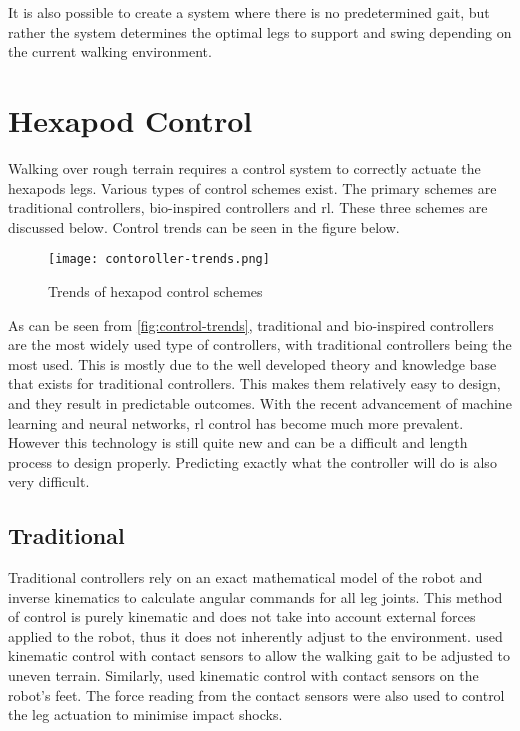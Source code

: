 It is also possible to create a system where there is no predetermined gait, but rather the system determines the optimal legs to support and swing depending on the current walking environment.

\section{Hexapod Control}
Walking over rough terrain requires a control system to correctly actuate the hexapods legs. Various types of control schemes exist. The primary schemes are traditional controllers, bio-inspired controllers and \ac{rl}. These three schemes are discussed below. Control trends can be seen in the figure below.
\begin{figure}[h]
    \centering
    \texttt{[image: contoroller-trends.png]}
    \caption{Trends of hexapod control schemes \citep{coelho2021trends}}
    \label{fig:control-trends}
\end{figure}

\noindent
As can be seen from \autoref{fig:control-trends}, traditional and bio-inspired controllers are the most widely used type of controllers, with traditional controllers being the most used. This is mostly due to the well developed theory and knowledge base that exists for traditional controllers. This makes them relatively easy to design, and they result in predictable outcomes. With the recent advancement of machine learning and neural networks, \ac{rl} control has become much more prevalent. However this technology is still quite new and can be a difficult and length process to design properly. Predicting exactly what the controller will do is also very difficult.

    \subsection{Traditional}
    Traditional controllers rely on an exact mathematical model of the robot and inverse kinematics to calculate angular commands for all leg joints. This method of control is purely kinematic and does not take into account external forces applied to the robot, thus it does not inherently adjust to the environment. \cite{Isvara2014} used kinematic control with contact sensors to allow the walking gait to be adjusted to uneven terrain. Similarly, \cite{Irwan2012} used kinematic control with contact sensors on the robot's feet. The force reading from the contact sensors were also used to control the leg actuation to minimise impact shocks. 


